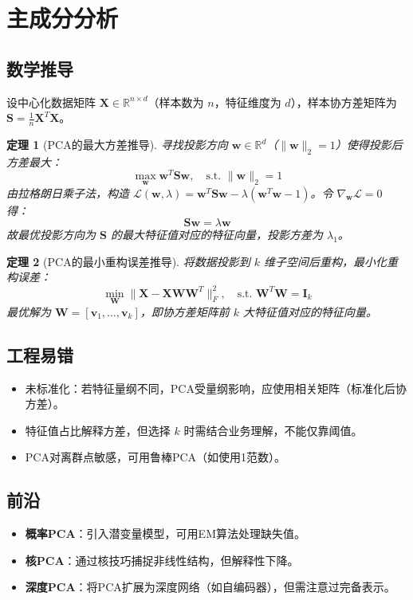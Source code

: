 \documentclass[UTF8, 10pt]{ctexart}
\newtheorem{theorem}{定理}[section]
\newcommand{\R}{\mathbb{R}}
\begin{document}
\section{主成分分析}
\subsection{数学推导}
设中心化数据矩阵 $\bm{X} \in \R^{n \times d}$（样本数为 $n$，特征维度为 $d$），样本协方差矩阵为 $\bm{S} = \frac{1}{n}\bm{X}^T\bm{X}$。

\begin{theorem}[PCA的最大方差推导]
寻找投影方向 $\bm{w} \in \R^d$（$\|\bm{w}\|_2 = 1$）使得投影后方差最大：
\[
\max_{\bm{w}} \bm{w}^T \bm{S} \bm{w}, \quad \text{s.t. } \|\bm{w}\|_2 = 1
\]
由拉格朗日乘子法，构造 $\mathcal{L}(\bm{w}, \lambda) = \bm{w}^T \bm{S} \bm{w} - \lambda(\bm{w}^T\bm{w} - 1)$。令 $\nabla_{\bm{w}} \mathcal{L} = 0$ 得：
\[
\bm{S}\bm{w} = \lambda \bm{w}
\]
故最优投影方向为 $\bm{S}$ 的最大特征值对应的特征向量，投影方差为 $\lambda_1$。
\end{theorem}

\begin{theorem}[PCA的最小重构误差推导]
将数据投影到 $k$ 维子空间后重构，最小化重构误差：
\[
\min_{\bm{W}} \|\bm{X} - \bm{X}\bm{W}\bm{W}^T\|_F^2, \quad \text{s.t. } \bm{W}^T\bm{W} = \bm{I}_k
\]
最优解为 $\bm{W} = [\bm{v}_1, \ldots, \bm{v}_k]$，即协方差矩阵前 $k$ 大特征值对应的特征向量。
\end{theorem}

\subsection{工程易错}
\begin{itemize}
    \item 未标准化：若特征量纲不同，PCA受量纲影响，应使用相关矩阵（标准化后协方差）。
    \item 特征值占比解释方差，但选择 $k$ 时需结合业务理解，不能仅靠阈值。
    \item PCA对离群点敏感，可用鲁棒PCA（如使用1范数）。
\end{itemize}

\subsection{前沿}
\begin{itemize}
    \item \textbf{概率PCA}：引入潜变量模型，可用EM算法处理缺失值。
    \item \textbf{核PCA}：通过核技巧捕捉非线性结构，但解释性下降。
    \item \textbf{深度PCA}：将PCA扩展为深度网络（如自编码器），但需注意过完备表示。
\end{itemize}
\end{document}
